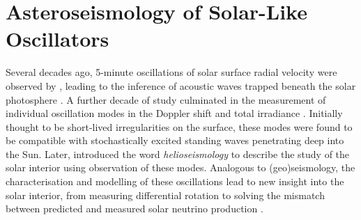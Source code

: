 %
%
%
%
%
\chapter[Asteroseismology]{Asteroseismology of Solar-Like Oscillators}

Several decades ago, 5-minute oscillations of solar surface radial velocity were observed by \citet{Leighton.Noyes.ea1962}, leading to the inference of acoustic waves trapped beneath the solar photosphere \citep{Ulrich1970}. A further decade of study culminated in the measurement of individual oscillation modes in the Doppler shift \citep{Claverie.Isaak.ea1979} and total irradiance \citep{Woodard.Hudson1983a}. Initially thought to be short-lived irregularities on the surface, these modes were found to be compatible with stochastically excited standing waves penetrating deep into the Sun. Later, \citet{Deubner.Gough1984} introduced the word \emph{helioseismology} to describe the study of the solar interior using observation of these modes. Analogous to (geo)seismology, the characterisation and modelling of these oscillations lead to new insight into the solar interior, from measuring differential rotation \citep{Deubner.Ulrich.ea1979} to solving the mismatch between predicted and measured solar neutrino production \citep{Bahcall.Ulrich1988}.


